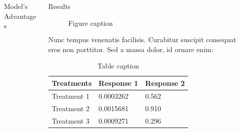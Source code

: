 \documentclass[final]{beamer}
\newlength{\sepwid}
\newlength{\onecolwid}
\newlength{\twocolwid}
\begin{document}
\begin{frame}[t]
\begin{columns}[t]
\begin{column}{\twocolwid}
\begin{columns}[t,totalwidth=\twocolwid]
\begin{column}{\onecolwid}
\begin{block}{Model's Advantages}
\end{block}


\end{column} %

\begin{column}{\onecolwid} %


\begin{block}{Results}

\begin{figure}
\caption{Figure caption}
\end{figure}

Nunc tempus venenatis facilisis. Curabitur suscipit consequat eros non
porttitor. Sed a massa dolor, id ornare enim:

\begin{table}
\vspace{2ex}
\begin{tabular}{l l l}
\toprule
\textbf{Treatments} & \textbf{Response 1} & \textbf{Response 2}\\
\midrule
Treatment 1 & 0.0003262 & 0.562 \\
Treatment 2 & 0.0015681 & 0.910 \\
Treatment 3 & 0.0009271 & 0.296 \\
\bottomrule
\end{tabular}
\caption{Table caption}
\end{table}

\end{block}


\end{column} %

\end{columns} %

\end{column} %

\begin{column}{\sepwid}\end{column} %


\end{columns}
\end{frame}
\end{document}

